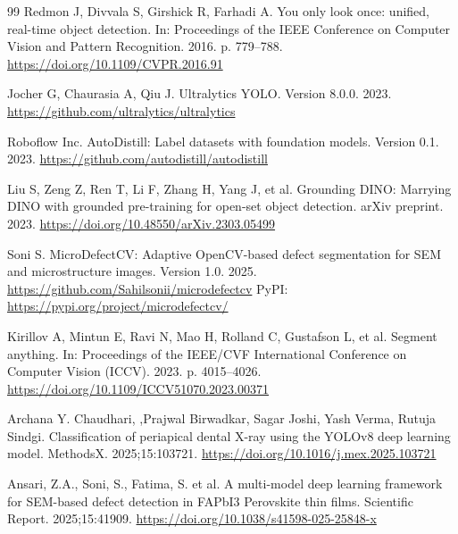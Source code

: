 \documentclass[pdflatex,sn-mathphys-num,iicol]{sn-jnl}
\theoremstyle{thmstyleone}
\theoremstyle{thmstyletwo}
\theoremstyle{thmstylethree}
\begin{document}
\begin{thebibliography}{99}
Redmon J, Divvala S, Girshick R, Farhadi A.
You only look once: unified, real-time object detection.
In: Proceedings of the IEEE Conference on Computer Vision and
Pattern Recognition. 2016. p. 779--788.
\url{https://doi.org/10.1109/CVPR.2016.91}

Jocher G, Chaurasia A, Qiu J.
Ultralytics YOLO. Version 8.0.0.
2023. \url{https://github.com/ultralytics/ultralytics}

Roboflow Inc.
AutoDistill: Label datasets with foundation models.
Version 0.1.
2023. \url{https://github.com/autodistill/autodistill}

Liu S, Zeng Z, Ren T, Li F, Zhang H, Yang J, et al.
Grounding DINO: Marrying DINO with grounded pre-training for
open-set object detection.
arXiv preprint. 2023.
\url{https://doi.org/10.48550/arXiv.2303.05499}

Soni S.
MicroDefectCV: Adaptive OpenCV-based defect segmentation for
SEM and microstructure images.
Version 1.0. 2025.
\url{https://github.com/Sahilsonii/microdefectcv}
PyPI: \url{https://pypi.org/project/microdefectcv/}

Kirillov A, Mintun E, Ravi N, Mao H, Rolland C, Gustafson L, et al.
Segment anything.
In: Proceedings of the IEEE/CVF International Conference on Computer
Vision (ICCV). 2023. p. 4015--4026.
\url{https://doi.org/10.1109/ICCV51070.2023.00371}

Archana Y. Chaudhari, ,Prajwal Birwadkar, Sagar Joshi, Yash Verma, Rutuja Sindgi.
Classification of periapical dental X-ray using the YOLOv8 deep learning model.
MethodsX. 2025;15:103721.
\url{https://doi.org/10.1016/j.mex.2025.103721}

Ansari, Z.A., Soni, S., Fatima, S. et al. A multi-model deep learning framework for SEM-based defect detection in FAPbI3 Perovskite thin films.
Scientific Report. 2025;15:41909.
\url{https://doi.org/10.1038/s41598-025-25848-x}
\end{thebibliography}
\end{document}
